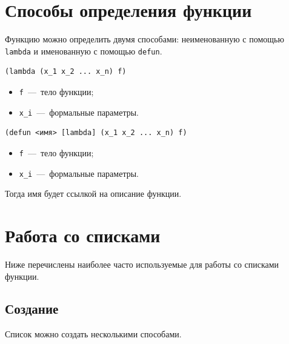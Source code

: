 \newpage


\section{Способы определения функции}
Функцию можно определить двумя способами: неименованную с помощью \texttt{lambda} и именованную с помощью \texttt{defun}.

\begin{code}
\begin{verbatim}
(lambda (x_1 x_2 ... x_n) f)
\end{verbatim}
\end{code}

\begin{itemize}
	\item \texttt{f}~---~тело функции;
	\item \texttt{x\_i}~---~формальные параметры.
\end{itemize}

\begin{code}
\begin{verbatim}
(defun <имя> [lambda] (x_1 x_2 ... x_n) f)
\end{verbatim}
\end{code}

\begin{itemize}
	\item \texttt{f}~---~тело функции;
	\item \texttt{x\_i}~---~формальные параметры. 
\end{itemize}

Тогда имя будет ссылкой на описание функции.


\section{Работа со списками}
Ниже перечислены наиболее часто используемые для работы со списками функции.

\subsection{Создание}
Список можно создать несколькими способами. 

